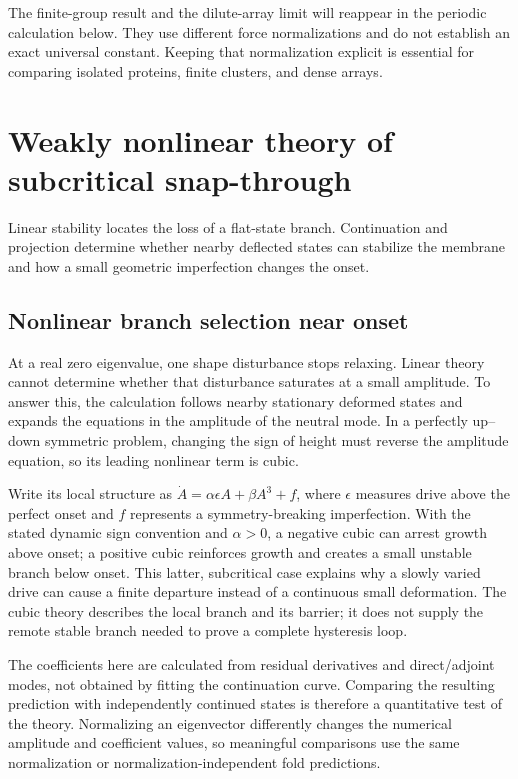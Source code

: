 The finite-group result and the dilute-array limit will reappear in the periodic calculation below. They use different force normalizations and do not establish an exact universal constant. Keeping that normalization explicit is essential for comparing isolated proteins, finite clusters, and dense arrays.


\section{Weakly nonlinear theory of subcritical snap-through}\label{sec:snap}
Linear stability locates the loss of a flat-state branch. Continuation and projection determine whether nearby deflected states can stabilize the membrane and how a small geometric imperfection changes the onset.


\subsection{Nonlinear branch selection near onset}
At a real zero eigenvalue, one shape disturbance stops relaxing. Linear theory cannot determine whether that disturbance saturates at a small amplitude. To answer this, the calculation follows nearby stationary deformed states and expands the equations in the amplitude of the neutral mode. In a perfectly up--down symmetric problem, changing the sign of height must reverse the amplitude equation, so its leading nonlinear term is cubic.

Write its local structure as $\dot A=\alpha\epsilon A+\beta A^3+f$, where $\epsilon$ measures drive above the perfect onset and $f$ represents a symmetry-breaking imperfection. With the stated dynamic sign convention and $\alpha>0$, a negative cubic can arrest growth above onset; a positive cubic reinforces growth and creates a small unstable branch below onset. This latter, subcritical case explains why a slowly varied drive can cause a finite departure instead of a continuous small deformation. The cubic theory describes the local branch and its barrier; it does not supply the remote stable branch needed to prove a complete hysteresis loop.

The coefficients here are calculated from residual derivatives and direct/adjoint modes, not obtained by fitting the continuation curve. Comparing the resulting prediction with independently continued states is therefore a quantitative test of the theory. Normalizing an eigenvector differently changes the numerical amplitude and coefficient values, so meaningful comparisons use the same normalization or normalization-independent fold predictions.


